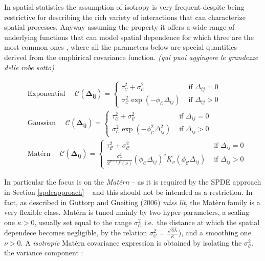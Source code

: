 \documentclass[
  12pt,
  a4paper,
  oneside]{book}
\theoremstyle{definition}
\theoremstyle{definition}
\theoremstyle{definition}
\theoremstyle{remark}
\begin{document}
In spatial statistics the assumption of isotropy is very frequent despite being restrictive for describing the rich variety of interactions that can characterize spatial processes. Anyway assuming the property it offers a wide range of underlying functions that can model spatial dependence for which three are the most common ones \citep{Krainski2018}, where all the parameters below are special quantities derived from the emphirical covariance function. \emph{(qui puoi aggingere le grandezze delle robe sotto)}

\[
\begin{aligned}
&\text { Exponential } \quad \mathscr{C}(\mathbf{ \Delta_{i j}})=\left\{\begin{array}{cl}
\tau^{2}_{\mathscr{C}}+\sigma^{2}_{\mathscr{C}} & \text { if }  \Delta_{i j}=0 \\
\sigma^{2}_{\mathscr{C}} \exp (-\phi_{\mathscr{C}} \Delta_{i j}) & \text { if } \Delta_{i j}>0 
\end{array}\right.\\
&\text { Gaussian } \quad \mathscr{C}(\mathbf{ \Delta_{i j}})=\left\{\begin{array}{cl}
\tau^{2}_{\mathscr{C}}+\sigma^{2}_{\mathscr{C}} & \text { if } \Delta_{i j}=0 \\
\sigma^{2}_{\mathscr{C}} \exp \left(-\phi^{2}_{\mathscr{C}}  \Delta_{i j}^{2}\right) & \text { if } \Delta_{i j}>0 
\end{array}\right. \\
&\text { Matérn } \quad \mathscr{C}(\mathbf{ \Delta_{i j}})=\left\{\begin{array}{cl}
\tau^{2}_{\mathscr{C}}+\sigma^{2}_{\mathscr{C}} & \text { if } \Delta_{i j}=0 \\
\frac{\sigma^{2}_{\mathscr{C}}}{2^{\nu-1} \Gamma(\nu)}(\phi_{\mathscr{C}}  \Delta_{i j})^{\nu} K_{\nu}(\phi_{\mathscr{C}}  \Delta_{i j}) & \text { if } \Delta_{i j}>0
\end{array}\right.
\end{aligned}
\]

In particular the focus is on the \emph{Matérn} -- as it is required by the SPDE approach in Section \ref{spdeapproach} -- and this should not be intended as a restriction. In fact, as described in Guttorp and Gneiting (2006) \emph{miss lit}, the Matèrn family is a very flexible class. Matérn is tuned mainly by two hyper-parameters, a scaling one \(\kappa>0\), usually set equal to the range \(\sigma_{\mathscr{C}}^{2}\) i.e.~the distance at which the spatial dependece becomes negligible, by the relation \(\sigma_{\mathscr{C}}^{2}=\frac{\sqrt{8 \lambda}}{\kappa}\)), and a smoothing one \(\nu>0\). A \emph{isotropic} Matérn covariance expression is obtained by isolating the \(\sigma_{\mathscr{C}}^{2}\), the variance component \citep{Cressie_2015}:
\end{document}
